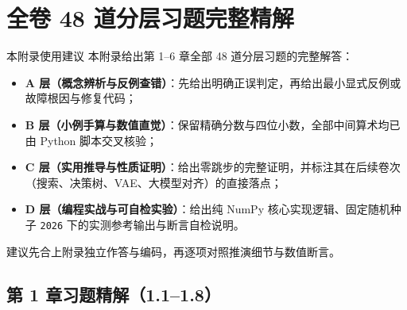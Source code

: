 \renewcommand{\chaptermark}[1]{\markboth{附录 \thechapter\quad #1}{}}

\chapter[全卷 48 道分层习题完整精解]{全卷 48 道分层习题完整精解}
\label{app:solutions}


\begin{chapIntro}{本附录使用建议}
本附录给出第 1--6 章全部 48 道分层习题的完整解答：
\begin{itemize}
  \item \textbf{A 层（概念辨析与反例查错）}：先给出明确正误判定，再给出最小显式反例或故障根因与修复代码；
  \item \textbf{B 层（小例手算与数值直觉）}：保留精确分数与四位小数，全部中间算术均已由 Python 脚本交叉核验；
  \item \textbf{C 层（实用推导与性质证明）}：给出零跳步的完整证明，并标注其在后续卷次（搜索、决策树、VAE、大模型对齐）的直接落点；
  \item \textbf{D 层（编程实战与可自检实验）}：给出纯 NumPy 核心实现逻辑、固定随机种子 \texttt{2026} 下的实测参考输出与断言自检说明。
\end{itemize}
建议先合上附录独立作答与编码，再逐项对照推演细节与数值断言。
\end{chapIntro}

\section{第 1 章习题精解（1.1--1.8）}

